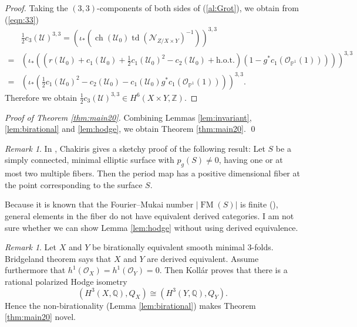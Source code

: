 \documentclass[a4paper,11pt]{article}
\theoremstyle{definition}\newtheorem{defn}[thm]{Definition}
\theoremstyle{remark}\newtheorem{remark}[thm]{Remark}
\numberwithin{equation}{section}
\newcommand{\td}{\ensuremath{\operatorname{td}}}
\newcommand{\ch}{\ensuremath{\operatorname{ch}}}
\newcommand{\FM}{\operatorname{FM}}
\newcommand{\mc}{\mathcal}
\newcommand{\PP}{\mathbb P}
\newcommand{\Z}{\mathbb Z}
\newcommand{\Q}{\mathbb Q}
\begin{document}
\begin{proof}
Taking the $(3,3)$-components of both sides of (\ref{al:Grot}), 
we obtain from (\ref{eqn:33})  
%
\begin{align*}
&\frac{1}{2}{c_3(\mc U)}^{3,3}
=(\iota_* (\ch (\mc U_0)\td (\mc N_{Z/X\times Y})^{-1}))^{3,3}\\
=&(\iota_* ((r(\mc U_0)+c_1(\mc U_0)+\frac{1}{2}c_1(\mc U_0)^2-c_2(\mc U_0)
+\text{h.o.t.})
(1-g^*c_1(\mc O_{\PP^1}(1)))))^{3,3} \\
=&(\iota_* (\frac{1}{2}c_1(\mc U_0)^2-c_2(\mc U_0)-c_1(\mc U_0)g^*c_1(\mc O_{\PP^1}(1))))^{3,3}.
\end{align*}
%
Therefore we obtain 
$\frac{1}{2}{c_3(\mc U)}^{3,3}\in H^6(X\times Y, \Z)$. 
\end{proof}

\noindent
\emph{Proof of Theorem \ref{thm:main20}.}
Combining Lemmas  \ref{lem:invariant}, \ref{lem:birational} and
\ref{lem:hodge}, we obtain Theorem \ref{thm:main20}.
\qed

\begin{remark}\label{rem:Chakiris}
In \cite{Ch80}, Chakiris gives  a sketchy proof of the following
result:
Let $S$ be a simply connected, minimal elliptic surface with 
$p_g(S)\ne 0$, having one or at most two multiple fibers.  
Then the period map has a positive dimensional fiber at the point 
corresponding to the surface $S$. 

Because it is known that the Fourier--Mukai number $|\FM (S)|$ is finite (\cite{BM01}),
general elements in the fiber do not have equivalent derived categories.
I am not sure whether we can show Lemma \ref{lem:hodge} 
without using derived equivalence. 
\end{remark}

\begin{remark}
Let $X$ and $Y$ be birationally equivalent smooth minimal 
 $3$-folds. Bridgeland theorem \cite{Br02} says that 
 $X$ and $Y$ are derived equivalent. 
 Assume furthermore  that 
 $h^1(\mc O_X)=h^1(\mc O_Y)= 0$.
Then Koll\'ar \cite{Ko89} proves that
there is a rational polarized Hodge isometry
$$
(H^3(X,\Q),Q_{X})\cong (H^3(Y,\Q),Q_{Y}).
$$  
Hence 
the non-birationality (Lemma \ref{lem:birational})
 makes Theorem \ref{thm:main20} novel.
\end{remark}


\end{document}
